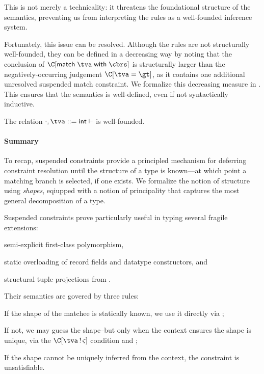 \documentclass[acmsmall,screen,nonacm]{acmart}
\begin{document}
This is not merely a technicality: it threatens the foundational
structure of the semantics, preventing us from interpreting the
rules as a well-founded inference system.

Fortunately, this issue can be resolved. Although the rules are not
structurally well-founded, they can be defined in a decreasing way by noting
that the conclusion of  $\C\where{\cmatch \tv \cbrs}$ is
structurally larger than the negatively-occurring judgement $\C\where{\cunif
\tv \gt}$, as it contains one additional unresolved suspended match constraint.
We formalize this decreasing measure in . This ensures that
the semantics is well-defined, even if not syntactically inductive.

\begin{theorem}
  The relation $\semenv \th \c$ is well-founded.
\end{theorem}

\paragraph{Summary}

To recap, suspended constraints provide a principled mechanism
for deferring constraint resolution until the structure of a type
is known---at which point a matching branch is selected, if one exists.
%
We formalize the notion of structure using \emph{shapes}, eqiupped with a
notion of principality that captures the most general decomposition of a
type.

Suspended constraints prove particularly useful in typing several
fragile \ML extensions:
\begin{enumerate*}
  \item semi-explicit first-class polymorphism,
  \item static overloading of record fields and datatype constructors, and
  \item structural tuple projections from \SML.
\end{enumerate*}

Their semantics are govered by three rules:
\begin{enumerate*}
  \item If the shape of the matchee is statically known, we use it
    directly via ;
  \item If not, we may guess the shape--but only when the context ensures
    the shape is unique, via the $\Cshape \C \tv \sh$ condition and
    ;
  \item If the shape cannot be uniquely inferred from the context, the constraint
    is unsatisfiable.
\end{enumerate*}
\end{document}
